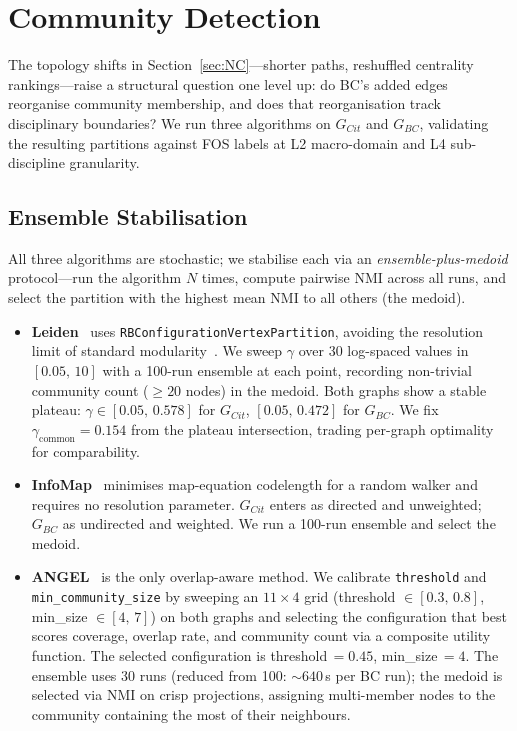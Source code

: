 \section{Community Detection}
\label{sec:CD}

The topology shifts in Section~\ref{sec:NC}---shorter paths, reshuffled centrality rankings---raise a structural question one level up: do BC's added edges reorganise community membership, and does that reorganisation track disciplinary boundaries?  We run three algorithms on $G_{Cit}$ and $G_{BC}$, validating the resulting partitions against FOS labels at L2 macro-domain and L4 sub-discipline granularity.

\subsection{Ensemble Stabilisation}
\label{subsec:cd:stabilisation}

All three algorithms are stochastic; we stabilise each via an \emph{ensemble-plus-medoid} protocol---run the algorithm $N$ times, compute pairwise NMI across all runs, and select the partition with the highest mean NMI to all others (the medoid).

\begin{itemize}

  \item \textbf{Leiden}~\cite{traag2019louvain} uses \texttt{RBConfiguration}\allowbreak\texttt{VertexPartition}, avoiding the resolution limit of standard modularity~\cite{fortunato2007resolution}.  We sweep $\gamma$ over 30 log-spaced values in $[0.05,\,10]$ with a 100-run ensemble at each point, recording non-trivial community count ($\geq 20$ nodes) in the medoid.  Both graphs show a stable plateau: $\gamma \in [0.05,\,0.578]$ for $G_{Cit}$, $[0.05,\,0.472]$ for $G_{BC}$.  We fix $\gamma_{\text{common}} = 0.154$ from the plateau intersection, trading per-graph optimality for comparability.

  \item \textbf{InfoMap}~\cite{rosvall2008maps} minimises map-equation codelength for a random walker and requires no resolution parameter. $G_{Cit}$ enters as directed and unweighted; $G_{BC}$ as undirected and weighted.  We run a 100-run ensemble and select the medoid.

  \item \textbf{ANGEL}~\cite{rossetti2019exorcising} is the only overlap-aware method.  We calibrate \texttt{threshold} and \texttt{min\_community\_size} by sweeping an $11\times 4$ grid (threshold $\in [0.3,\,0.8]$, min\_size $\in [4,\,7]$) on both graphs and selecting the configuration that best scores coverage, overlap rate, and community count via a composite utility function.  The selected configuration is threshold\,$=0.45$, min\_size\,$=4$.  The ensemble uses 30 runs (reduced from 100: ${\sim}640$\,s per BC run); the medoid is selected via NMI on crisp projections, assigning multi-member nodes to the community containing the most of their neighbours.
\end{itemize}

